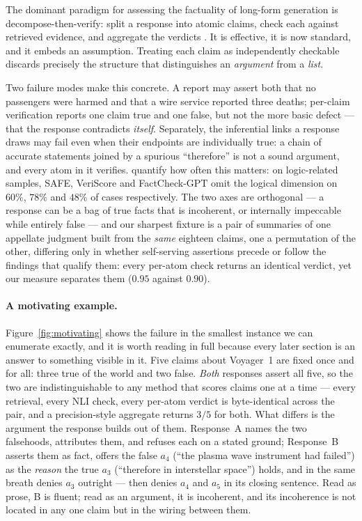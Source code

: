 The dominant paradigm for assessing the factuality of long-form generation is decompose-then-verify:
split a response into atomic claims, check each against retrieved evidence, and aggregate the verdicts
\citep{factscore,safe,veriscore}. It is effective, it is now standard, and it embeds an assumption.
Treating each claim as independently checkable discards precisely the structure that distinguishes an
\emph{argument} from a \emph{list}.

Two failure modes make this concrete. A report may assert both that no passengers were harmed and that a wire
service reported three deaths; per-claim verification reports one claim true and one false, but not the more
basic defect --- that the response contradicts \emph{itself}. Separately, the inferential links a response
draws may fail even when their endpoints are individually true: a chain of accurate statements joined by a
spurious ``therefore'' is not a sound argument, and every atom in it verifies. \citet{lorefact} quantify how
often this matters: on logic-related samples, SAFE, VeriScore and FactCheck-GPT omit the logical dimension on
$60\%$, $78\%$ and $48\%$ of cases respectively. The two axes are orthogonal --- a response can be a bag of
true facts that is incoherent, or internally impeccable while entirely false --- and our sharpest fixture is a
pair of summaries of one appellate judgment built from the \emph{same} eighteen claims, one a permutation of
the other, differing only in whether self-serving assertions precede or follow the findings that qualify them:
every per-atom check returns an identical verdict, yet our measure separates them ($0.95$ against $0.90$).



\paragraph{A motivating example.}
Figure~\ref{fig:motivating} shows the failure in the smallest instance we can enumerate exactly, and it is
worth reading in full because every later section is an answer to something visible in it. Five claims about
Voyager~1 are fixed once and for all: three true of the world and two false. \emph{Both} responses assert all
five, so the two are indistinguishable to any method that scores claims one at a time --- every retrieval,
every NLI check, every per-atom verdict is byte-identical across the pair, and a precision-style aggregate
returns $3/5$ for both. What differs is the argument the response builds out of them. Response~A names the two
falsehoods, attributes them, and refuses each on a stated ground; Response~B asserts them as fact, offers the
false $a_4$ (``the plasma wave instrument had failed'') as the \emph{reason} the true $a_3$ (``therefore in
interstellar space'') holds, and in the same breath denies $a_3$ outright --- then denies $a_4$ and $a_5$ in
its closing sentence. Read as prose, B is fluent; read as an argument, it is incoherent, and its incoherence is
not located in any one claim but in the wiring between them.

